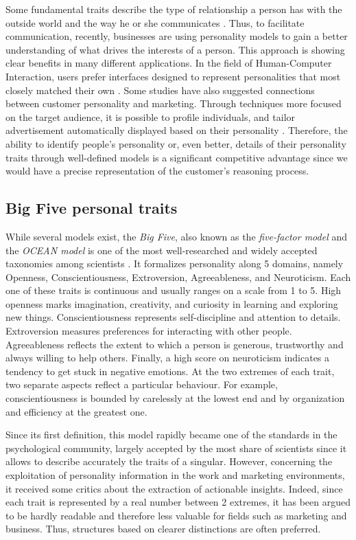Some fundamental traits describe the type of relationship a person has with the outside world and the way he or she communicates \cite{lima2016predicting}.
Thus, to facilitate communication, recently, businesses are using personality models to gain a better understanding of what drives the interests of a person.
This approach is showing clear benefits in many different applications.
In the field of Human-Computer Interaction, users prefer interfaces designed to represent personalities that most closely matched their own \cite{nass2000does}.
Some studies have also suggested connections between customer personality and marketing. Through techniques more focused on the target audience, it is possible to profile individuals, and tailor advertisement automatically displayed based on their personality \cite{bachrach2012personality}.
Therefore, the ability to identify people's personality or, even better, details of their personality traits through well-defined models is a significant competitive advantage since
we would have a precise representation of the customer's reasoning process.

\subsection{Big Five personal traits}
While several models exist, the \textit{Big Five}, also known as the \textit{five-factor model} and the \textit{OCEAN model} is one of the most well-researched and widely accepted taxonomies among scientists \cite{mccrae1992introduction, mccrae1987validation}.
It formalizes personality along 5 domains, namely Openness, Conscientiousness, Extroversion, Agreeableness, and Neuroticism. Each one of these traits is continuous and usually ranges on a scale from 1 to 5.
High openness marks imagination, creativity, and curiosity in learning and exploring new things. Conscientiousness represents self-discipline and attention to details.
Extroversion measures preferences for interacting with other people. Agreeableness reflects the extent to which a person is generous, trustworthy and always willing to help others.
Finally, a high score on neuroticism indicates a tendency to get stuck in negative emotions.
At the two extremes of each trait, two separate aspects reflect a particular behaviour. 
For example, conscientiousness is bounded by carelessly at the lowest end and by organization and efficiency at the greatest one.

Since its first definition, this model rapidly became one of the standards in the psychological community, largely accepted by the most share of scientists since it allows to describe accurately the traits of a singular.
However, concerning the exploitation of personality information in the work and marketing environments, it received some critics about the extraction of actionable insights\cite{hough2003use, patton2014career}.
Indeed, since each trait is represented by a real number between 2 extremes, it has been argued to be hardly readable and therefore less valuable for fields such as marketing and business.
Thus, structures based on clearer distinctions are often preferred.

